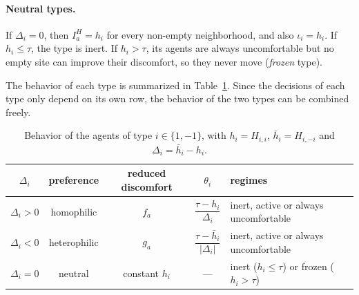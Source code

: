 \documentclass{article}
\theoremstyle{remark}
\begin{document}
\paragraph{Neutral types.} If $\Delta_i=0$, then $I_a^H=h_i$ for every non-empty neighborhood, and also $\iota_i=h_i$. If $h_i\le\tau$, the type is inert. If $h_i>\tau$, its agents are always uncomfortable but no empty site can improve their discomfort, so they never move (\emph{frozen} type).

The behavior of each type is summarized in Table~\ref{tab:types}. Since the decisions of each type only depend on its own row, the behavior of the two types can be combined freely.

\begin{table}[h!]
\centering
\begin{tabular}{|c|c|c|c|p{3.6cm}|}
\hline
$\Delta_i$ & preference & reduced discomfort & $\theta_i$ & regimes \\
\hline
$\Delta_i>0$ & homophilic & $f_a$ & $\dfrac{\tau-h_i}{\Delta_i}$ & inert, active or always uncomfortable \\[1.5ex]
\hline
$\Delta_i<0$ & heterophilic & $g_a$ & $\dfrac{\tau-\bar h_i}{|\Delta_i|}$ & inert, active or always uncomfortable \\[1.5ex]
\hline
$\Delta_i=0$ & neutral & constant $h_i$ & --- & inert ($h_i\le\tau$) or frozen ($h_i>\tau$) \\
\hline
\end{tabular}
\caption{Behavior of the agents of type $i\in\{1,-1\}$, with $h_i=H_{i,i}$, $\bar h_i=H_{i,-i}$ and $\Delta_i=\bar h_i-h_i$.}
\label{tab:types}
\end{table}
\end{document}
